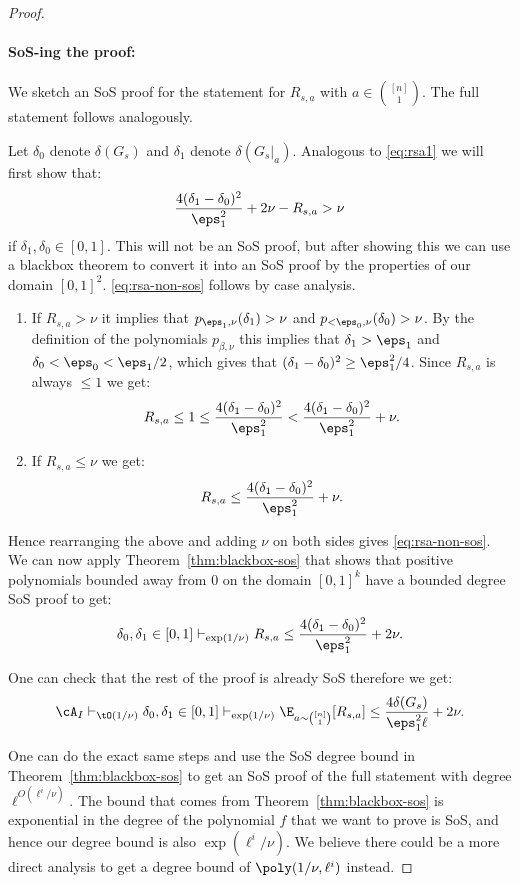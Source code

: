 \begin{proof}
\paragraph{SoS-ing the proof:} We sketch an SoS proof for the statement for $R_{s,a}$ with $a \in {[n] \choose 1}$. The full statement follows analogously. 

Let $\delta_0$ denote $\delta(G_s)$ and $\delta_1$ denote $\delta(G_s|_a).$ Analogous to \eqref{eq:rsa1} we will first show that:
\begin{equation}\label{eq:rsa-non-sos}
\frac{4(\delta_1 - \delta_0)^2}{\eps_1^2} + 2\nu - R_{s,a} > \nu
\end{equation}
if $\delta_1,\delta_0 \in [0,1]$. This will not be an SoS proof, but after showing this we can use a blackbox theorem to convert it into an SoS proof by the properties of our domain $[0,1]^2$. \eqref{eq:rsa-non-sos} follows by case analysis. 
\begin{enumerate}
    \item If $R_{s,a} > \nu$ it implies that $p_{\eps_1,\nu}(\delta_1) > \nu$ and $p_{<\eps_0,\nu}(\delta_0) > \nu$. By the definition of the polynomials $p_{\beta,\nu}$ this implies that $\delta_1 > \eps_1$ and $\delta_0 < \eps_0 < \eps_1/2$, which gives that $(\delta_1 - \delta_0)^2 \geq \eps_1^2/4$. Since $R_{s,a}$ is always $\leq 1$ we get:
    \[R_{s,a} \leq 1 \leq \frac{4(\delta_1 - \delta_0)^2}{\eps_1^2} < \frac{4(\delta_1 - \delta_0)^2}{\eps_1^2}+\nu.\]
    \item If $R_{s,a} \leq \nu$ we get:
    \[R_{s,a} \leq \frac{4(\delta_1 - \delta_0)^2}{\eps_1^2} + \nu.\]
\end{enumerate}
Hence rearranging the above and adding $\nu$ on both sides gives \eqref{eq:rsa-non-sos}. We can now apply Theorem~\ref{thm:blackbox-sos} that shows that positive polynomials bounded away from $0$ on the domain $[0,1]^k$ have a bounded degree SoS proof to get:
\[\delta_0,\delta_1 \in [0,1] \vdash_{\exp(1/\nu)} R_{s,a} \leq \frac{4(\delta_1 - \delta_0)^2}{\eps_1^2} + 2\nu.\]

One can check that the rest of the proof is already SoS therefore we get:
\[\cA_I \vdash_{\tO(1/\nu)} \delta_0,\delta_1 \in [0,1] \vdash_{\exp(1/\nu)} \E_{a \sim {[n] \choose 1}}[R_{s,a}] \leq \frac{4\delta(G_s)}{\eps_1^2\ell} + 2\nu.\]

One can do the exact same steps and use the SoS degree bound in Theorem~\ref{thm:blackbox-sos} to get an SoS proof of the full statement with degree $\ell^{O(\ell^i/\nu)}$. The bound that comes from Theorem~\ref{thm:blackbox-sos} is exponential in the degree of the polynomial $f$ that we want to prove is SoS, and hence our degree bound is also $\exp(\ell^i/\nu)$. We believe there could be a more direct analysis to get a degree bound of $\poly(1/\nu, \ell^i)$ instead.
\end{proof}

